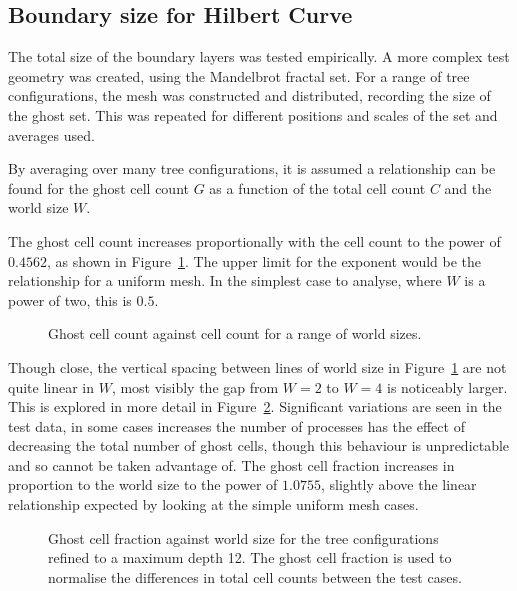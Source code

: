 \documentclass[twoside]{IIBproject}
\numberwithin{figure}{section}
\begin{document}
    \subsection{Boundary size for Hilbert Curve}
        \label{sec:results-boundarysize}

        The total size of the boundary layers was tested empirically. A more complex test geometry was created, using the Mandelbrot fractal set. For a range of tree configurations, the mesh was constructed and distributed, recording the size of the ghost set. This was repeated for different positions and scales of the set and averages used.

        By averaging over many tree configurations, it is assumed a relationship can be found for the ghost cell count $G$ as a function of the total cell count $C$ and the world size $W$.

        The ghost cell count increases proportionally with the cell count to the power of $0.4562$, as shown in Figure~\ref{fig:anal-scaling}. The upper limit for the exponent would be the relationship for a uniform mesh. In the simplest case to analyse, where $W$ is a power of two, this is $0.5$. 

        \tikzset{external/export next=false}
        \begin{figure}[H]
            \centering
            
            \caption{Ghost cell count against cell count for a range of world sizes. }
            \label{fig:anal-scaling}
        \end{figure}

        Though close, the vertical spacing between lines of world size in Figure~\ref{fig:anal-scaling} are not quite linear in $W$, most visibly the gap from $W=2$ to $W=4$ is noticeably larger. This is explored in more detail in Figure~\ref{fig:anal-borderworldsize}. Significant variations are seen in the test data, in some cases increases the number of processes has the effect of decreasing the total number of ghost cells, though this behaviour is unpredictable and so cannot be taken advantage of. The ghost cell fraction increases in proportion to the world size to the power of $1.0755$, slightly above the linear relationship expected by looking at the simple uniform mesh cases. 

        \tikzset{external/export next=false}
        \begin{figure}[H]
            \centering
            
            \caption{Ghost cell fraction against world size for the tree configurations refined to a maximum depth 12. The ghost cell fraction is used to normalise the differences in total cell counts between the test cases.}
            \label{fig:anal-borderworldsize}
        \end{figure}
\end{document}

